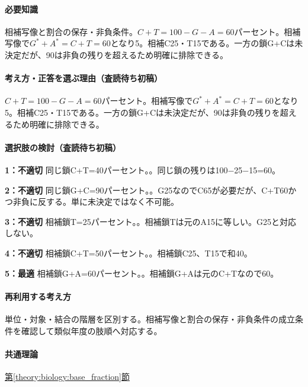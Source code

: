 \paragraph{必要知識} 相補写像と割合の保存・非負条件。\(C+T=100-G-A=60\)パーセント。相補写像で\(G^{\ast}+A^{\ast}=C+T=60\)となり5。相補C25・T15である。一方の鎖G+Cは未決定だが、90は非負の残りを超えるため明確に排除できる。

\paragraph{考え方・正答を選ぶ理由（査読待ち初稿）} \(C+T=100-G-A=60\)パーセント。相補写像で\(G^{\ast}+A^{\ast}=C+T=60\)となり5。相補C25・T15である。一方の鎖G+Cは未決定だが、90は非負の残りを超えるため明確に排除できる。

\paragraph{選択肢の検討（査読待ち初稿）}\mbox{}\par

\noindent\textbf{1：不適切} 同じ鎖C+T=\allowbreak{}40パーセント。。同じ鎖の残りは100−25−15=\allowbreak{}60。\par

\noindent\textbf{2：不適切} 同じ鎖G+C=\allowbreak{}90パーセント。。G25なのでC65が必要だが、C+T60かつ非負に反する。単に未決定ではなく不可能。\par

\noindent\textbf{3：不適切} 相補鎖T=\allowbreak{}25パーセント。。相補鎖Tは元のA15に等しい。G25と対応しない。\par

\noindent\textbf{4：不適切} 相補鎖C+T=\allowbreak{}50パーセント。。相補鎖C25、T15で和40。\par

\noindent\textbf{5：最適} 相補鎖G+A=\allowbreak{}60パーセント。。相補鎖G+Aは元のC+Tなので60。\par

\paragraph{再利用する考え方} 単位・対象・結合の階層を区別する。相補写像と割合の保存・非負条件の成立条件を確認して類似年度の肢順へ対応する。

\paragraph{共通理論} \hyperref[theory:biology:base_fraction]{第\ref*{theory:biology:base_fraction}節}

